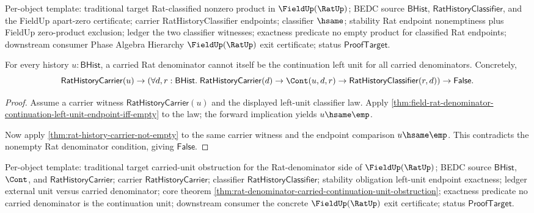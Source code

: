 Per-object template: traditional target Rat-classified nonzero product in
$\FieldUp(\RatUp)$; BEDC source $\mathsf{BHist}$,
$\mathsf{RatHistoryClassifier}$, and the FieldUp apart-zero certificate;
carrier RatHistoryClassifier endpoints; classifier $\hsame$; stability Rat
endpoint nonemptiness plus FieldUp zero-product exclusion; ledger the two
classifier witnesses; exactness predicate no empty product for classified Rat
endpoints; downstream consumer Phase Algebra Hierarchy $\FieldUp(\RatUp)$ exit
certificate; status $\mathsf{ProofTarget}$.

\begin{theorem}
\label{thm:rat-denominator-carried-continuation-unit-obstruction}
For every history $u:\mathsf{BHist}$, a carried Rat denominator cannot itself be
the continuation left unit for all carried denominators. Concretely,
$$
\mathsf{RatHistoryCarrier}(u)
\to
\left(
\forall d,r:\mathsf{BHist}.\;
\mathsf{RatHistoryCarrier}(d)\to
\Cont(u,d,r)\to
\mathsf{RatHistoryClassifier}(r,d)
\right)
\to
\mathsf{False}.
$$
\end{theorem}
\begin{proof}
Assume a carrier witness $\mathsf{RatHistoryCarrier}(u)$ and the displayed
left-unit classifier law. Apply
\autoref{thm:field-rat-denominator-continuation-left-unit-endpoint-iff-empty}
to the law; the forward implication yields $u\hsame\emp$.

Now apply \autoref{thm:rat-history-carrier-not-empty} to the same carrier
witness and the endpoint comparison $u\hsame\emp$. This contradicts the
nonempty Rat denominator condition, giving $\mathsf{False}$.
\end{proof}

Per-object template: traditional target carried-unit obstruction for the
Rat-denominator side of $\FieldUp(\RatUp)$; BEDC source $\mathsf{BHist}$,
$\Cont$, and $\mathsf{RatHistoryCarrier}$; carrier
$\mathsf{RatHistoryCarrier}$; classifier $\mathsf{RatHistoryClassifier}$;
stability obligation left-unit endpoint exactness; ledger external unit versus
carried denominator; core theorem
\autoref{thm:rat-denominator-carried-continuation-unit-obstruction}; exactness
predicate no carried denominator is the continuation unit; downstream consumer
the concrete $\FieldUp(\RatUp)$ exit certificate; status $\mathsf{ProofTarget}$.
